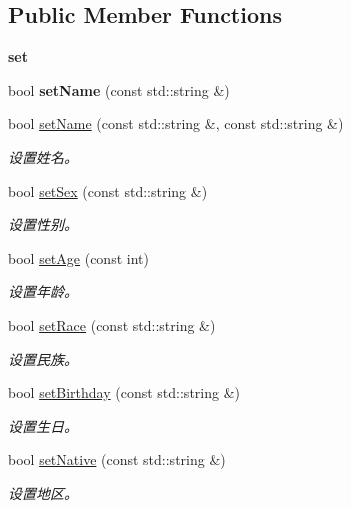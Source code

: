 \subsection*{\-Public \-Member \-Functions}
\begin{Indent}{\bf set}\par
\begin{DoxyCompactItemize}
\item 
\hypertarget{classepPerson_a2bf9b03eb831d8eb2fff5360e06ad740}{bool {\bfseries set\-Name} (const std\-::string \&)}\label{classepPerson_a2bf9b03eb831d8eb2fff5360e06ad740}

\item 
bool \hyperlink{classepPerson_a53be34a8618acf2ef6fede765e754bf3}{set\-Name} (const std\-::string \&, const std\-::string \&)
\begin{DoxyCompactList}\small\item\em 设置姓名。 \end{DoxyCompactList}\item 
bool \hyperlink{classepPerson_a7d91210c5f003eddc530cceb915ebf2d}{set\-Sex} (const std\-::string \&)
\begin{DoxyCompactList}\small\item\em 设置性别。 \end{DoxyCompactList}\item 
bool \hyperlink{classepPerson_aec70b13c4a9dfae235aad9d1f4d1d54c}{set\-Age} (const int)
\begin{DoxyCompactList}\small\item\em 设置年龄。 \end{DoxyCompactList}\item 
bool \hyperlink{classepPerson_a4f41bd4fbff91cf608bf4850b4ca2e0a}{set\-Race} (const std\-::string \&)
\begin{DoxyCompactList}\small\item\em 设置民族。 \end{DoxyCompactList}\item 
bool \hyperlink{classepPerson_a3ab84a94bd5849a1ff0e5e74a15512d6}{set\-Birthday} (const std\-::string \&)
\begin{DoxyCompactList}\small\item\em 设置生日。 \end{DoxyCompactList}\item 
bool \hyperlink{classepPerson_a2aa9a34f6b88c071ab500c94a5eb9151}{set\-Native} (const std\-::string \&)
\begin{DoxyCompactList}\small\item\em 设置地区。 \end{DoxyCompactList}\end{DoxyCompactItemize}
\end{Indent}
